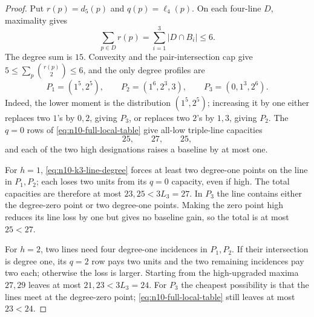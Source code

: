 \begin{proof}
Put $r(p)=d_5(p)$ and $q(p)=\ell_4(p)$.  On each four-line $D$,
maximality gives
\begin{equation}\label{eq:n10-k3-line-degree}
 \sum_{p\in D}r(p)=\sum_{i=1}^3|D\cap B_i|\le6.
\end{equation}
The degree sum is $15$.  Convexity and the pair-intersection cap give
$5\le\sum_p\binom{r(p)}2\le6$, and the only degree profiles are
\begin{equation}\label{eq:n10-k3-profiles}
 P_1=(1^5,2^5),\qquad
 P_2=(1^6,2^3,3),\qquad
 P_3=(0,1^3,2^6).
\end{equation}
Indeed, the lower moment is the distribution $(1^5,2^5)$; increasing it
by one either replaces two \(1\)'s by \(0,2\), giving \(P_3\), or replaces
two \(2\)'s by \(1,3\), giving \(P_2\).  The $q=0$ rows of
\eqref{eq:n10-full-local-table} give all-low
triple-line capacities
\begin{equation}\label{eq:n10-k3-baselines}
 25,\qquad27,\qquad25,
\end{equation}
and each of the two high designations raises a baseline by at most one.

For $h=1$, \eqref{eq:n10-k3-line-degree} forces at least two degree-one
points on the line in $P_1,P_2$; each loses two units from its $q=0$
capacity, even if high.  The total capacities are therefore at most
$23,25<3L_3=27$.  In $P_3$ the line contains either the degree-zero point
or two degree-one points.  Making the zero point high reduces its line loss
by one but gives no baseline gain, so the total is at most $25<27$.

For $h=2$, two lines need four degree-one incidences in $P_1,P_2$.  If
their intersection is degree one, its $q=2$ row pays two units and the two
remaining incidences pay two each; otherwise the loss is larger.  Starting
from the high-upgraded maxima $27,29$ leaves at most $21,23<3L_3=24$.
For $P_3$ the cheapest possibility is that the lines meet at the
degree-zero point; \eqref{eq:n10-full-local-table} still leaves at most
$23<24$.


\end{proof}
